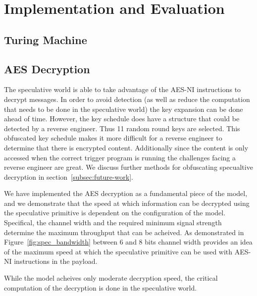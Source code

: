 
\section{Implementation and Evaluation}

\subsection{Turing Machine}



\subsection{AES Decryption}
\label{subsec:impl-aes}
The speculative world is able to take advantage of the AES-NI instructions to
decrypt messages. In order to avoid detection (as well as reduce the computation
that needs to be done in the speculative world) the key expansion can be done
ahead of time. However, the key schedule does have a structure that could be
detected by a reverse engineer. Thus 11 random round keys are selected. This
obfuscated key schedule makes it more difficult for a reverse engineer to
determine that there is encrypted content. Additionally since the content is
only accessed when the correct trigger program is running the challenges facing
a reverse engineer are great. We discuss further methods for obfuscating specualtive
decryption in section~\ref{subsec:future-work}. 


We have implemented the AES decryption as a fundamental piece of the \speculake model,
and we demonstrate that the speed at which information can be decrypted using the speculative 
primitive is dependent on the configuration of the \speculake model. Specifical,
the channel width and the required minimum signal strength determine the maximum
throughput that can be acheived. As demonstrated in Figure~\ref{fig:spec_bandwidth} 
between 6 and 8 bits channel width provides an idea of the maximum speed at which the 
speculative primitive can be used with AES-NI instructions in the payload. 

While the \speculake model acheives only moderate decryption speed, the 
critical computation of the decryption is done in the speculative world. 

